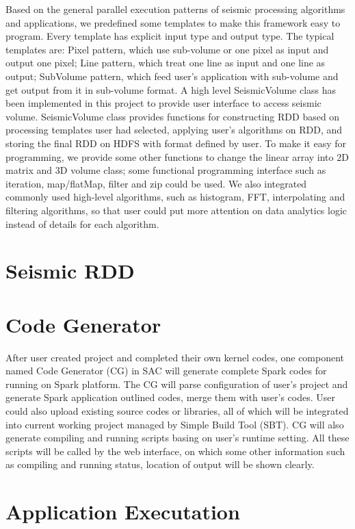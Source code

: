Based on the general parallel execution patterns of seismic processing algorithms and applications, we predefined some templates to make this framework easy to program. Every template has explicit input type and output type. The typical templates are: Pixel pattern, which use sub-volume or one pixel as input and output one pixel; Line pattern, which treat one line as input and one line as output; SubVolume pattern, which feed user’s application with sub-volume and get output from it in sub-volume format. A high level SeismicVolume class has been implemented in this project to provide user interface to access seismic volume. SeismicVolume class provides functions for constructing RDD based on processing templates user had selected, applying user's algorithms on RDD, and storing the final RDD on HDFS with format defined by user. To make it easy for programming, we provide some other functions to change the linear array into 2D matrix and 3D volume class; some functional programming interface such as iteration, map/flatMap, filter and zip could be used. We also integrated commonly used high-level algorithms, such as histogram, FFT, interpolating and filtering algorithms, so that user could put more attention on data analytics logic instead of details for each algorithm.

\section{Seismic RDD}


\section{Code Generator}

After user created project and completed their own kernel codes, one component named Code Generator (CG) in SAC will generate complete Spark codes for running on Spark platform. The CG will parse configuration of user's project and generate Spark application outlined codes, merge them with user's codes. User could also upload existing source codes or libraries, all of which will be integrated into current working project managed by Simple Build Tool (SBT). CG will also generate compiling and running scripts basing on user's runtime setting. All these scripts will be called by the web interface, on which some other information such as compiling and running status, location of output will be shown clearly.

\section{Application Executation}

